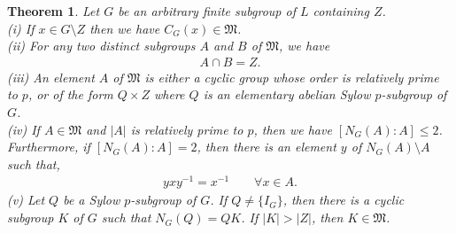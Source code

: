 \documentclass[a4paper , 11pt]{book}
\newtheorem{theorem}{Theorem}[chapter]
\theoremstyle{definition}
\theoremstyle{remark}
\begin{document}
\begin{theorem}\label{6.8} Let $G$ be an arbitrary finite subgroup of $L$ containing $Z$. \\

(i) If $x \in G \! \setminus \! Z$ then we have $C_G(x) \in \mathfrak{M}$. \vspace{3mm} \\
(ii) For any two distinct subgroups $A$ and $B$ of $\mathfrak{M}$, we have
\begin{align*} A \cap B = Z. \end{align*}
(iii) An element $A$ of $\mathfrak{M}$ is either a cyclic group whose order is relatively prime to $p$, or of the form $Q \times Z$ where $Q$ is an elementary abelian Sylow $p$-subgroup of $G$. \vspace{3mm} \\
(iv) If $A \in \mathfrak{M}$ and $|A|$ is relatively prime to $p$, then we have $[N_G(A): A] \leq 2$. Furthermore, if $[N_G(A): A] = 2$, then there is an element $y$ of $N_G(A) \! \setminus \! A$ such that, 
\vspace{-1mm}
\begin{align*} yxy^{-1} = x^{-1} \qquad \forall x \in A.\end{align*}
(v) Let $Q$ be a Sylow $p$-subgroup of $G$. If $Q \neq \{I_G\}$, then there is a cyclic subgroup $K$ of $G$ such that $N_G(Q) = QK$. If $|K| > |Z|$, then $K \in \mathfrak{M}$. \\
\end{theorem}
\end{document}
